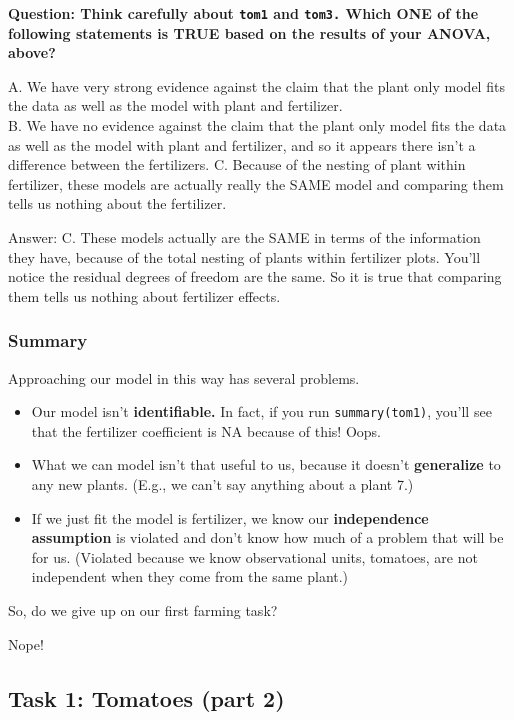 \documentclass[
  openany]{book}
\providecommand{\tightlist}{%
  \setlength{\itemsep}{0pt}\setlength{\parskip}{0pt}}
\begin{document}
\textbf{Question: Think carefully about \texttt{tom1} and \texttt{tom3.} Which ONE of the following statements is TRUE based on the results of your ANOVA, above?}

A. We have very strong evidence against the claim that the plant only model fits the data as well as the model with plant and fertilizer.\\
B. We have no evidence against the claim that the plant only model fits the data as well as the model with plant and fertilizer, and so it appears there isn't a difference between the fertilizers.
C. Because of the nesting of plant within fertilizer, these models are actually really the SAME model and comparing them tells us nothing about the fertilizer.

Answer: C. These models actually are the SAME in terms of the information they have, because of the total nesting of plants within fertilizer plots. You'll notice the residual degrees of freedom are the same. So it is true that comparing them tells us nothing about fertilizer effects.

\hypertarget{summary}{%
\subsubsection{Summary}\label{summary}}

Approaching our model in this way has several problems.

\begin{itemize}
\tightlist
\item
  Our model isn't \textbf{identifiable.} In fact, if you run \texttt{summary(tom1)}, you'll see that the fertilizer coefficient is NA because of this! Oops.
\item
  What we can model isn't that useful to us, because it doesn't \textbf{generalize} to any new plants. (E.g., we can't say anything about a plant 7.)
\item
  If we just fit the model is fertilizer, we know our \textbf{independence assumption} is violated and don't know how much of a problem that will be for us. (Violated because we know observational units, tomatoes, are not independent when they come from the same plant.)
\end{itemize}

So, do we give up on our first farming task?

Nope!

\hypertarget{task-1-tomatoes-part-2}{%
\subsection{Task 1: Tomatoes (part 2)}\label{task-1-tomatoes-part-2}}
\end{document}
